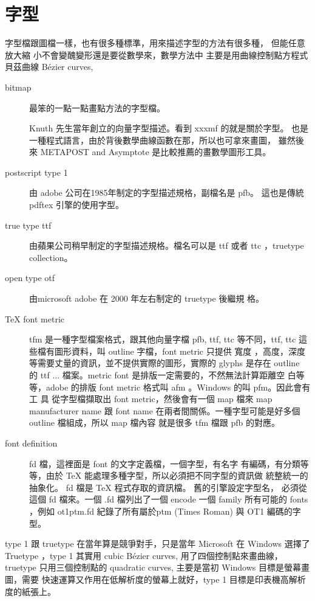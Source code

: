 \section{字型}
字型檔跟圖檔一樣，也有很多種標準，用來描述字型的方法有很多種， 但能任意放大縮
小不會變醜變形還是要從數學來，數學方法中 主要是用曲線控制點方程式貝茲曲線
Bézier curves,
\begin{description}
  \item [bitmap] 最笨的一點一點畫點方法的字型檔。
  \item [\MF{}] Knuth 先生當年創立的向量字型描述。看到 xxxmf 的就是關於字型。
    \MF{} 也是一種程式語言，由於背後數學曲線函數在那，所以也可拿來畫圖，
    雖然後來 METAPOST and Asymptote 是比較推薦的畫數學圖形工具。
  \item [postscript type 1] 由 adobe 公司在1985年制定的字型描述規格，副檔名是
    pfb。 這也是傳統 pdftex 引擎的使用字型。
  \item [true type ttf] 由蘋果公司稍早制定的字型描述規格。檔名可以是 ttf 或者
    ttc ，truetype collection。
  \item [open type otf] 由microsoft adobe 在 2000 年左右制定的 truetype 後繼規
    格。
  \item [\TeX{} font metric] tfm 是一種字型檔案格式，跟其他向量字檔 pfb, ttf,
    ttc 等不同，ttf, ttc 這些檔有圖形資料，叫 outline 字檔，font metric 只提供
    寬度 ，高度，深度等需要丈量的資訊，並不提供實際的圖形，實際的 glyphs 是存在
    outline 的 ttf ... 檔案。metric font 是排版一定需要的，不然無法計算距離空
    白等等，adobe 的排版 font metric 格式叫 afm 。Windows 的叫 pfm。因此會有工
    具 從字型檔擷取出 font metric，然後會有一個 map 檔來 map manufacturer name
    跟 font name 在兩者間關係。一種字型可能是好多個 outline 檔組成，所以 map
    檔內容 就是很多 tfm 檔跟 pfb 的對應。
  \item [font definition] fd 檔，這裡面是 font 的文字定義檔，一個字型，有名字
    有編碼，有分類等等，由於 \TeX{} 能處理多種字型，所以必須把不同字型的資訊做
    統整統一的抽象化。 fd 檔是 \TeX{} 程式存取的資訊檔。 舊的引擎設定字型名，
    必須從這個 fd 檔來。一個 .fd 檔列出了一個 encode 一個 family 所有可能的
    fonts ，例如 ot1ptm.fd 紀錄了所有屬於ptm (Times Roman) 與 OT1 編碼的字型。
\end{description}
type 1 跟 truetype 在當年算是競爭對手，只是當年 Microsoft 在 Windows 選擇了
Truetype ，type 1 其實用 cubic Bézier curves, 用了四個控制點來畫曲線，truetype
只用三個控制點的 quadratic curves, 主要是當初 Windows 目標是螢幕畫圖，需要
快速運算又作用在低解析度的螢幕上就好，type 1 目標是印表機高解析度的紙張上。
